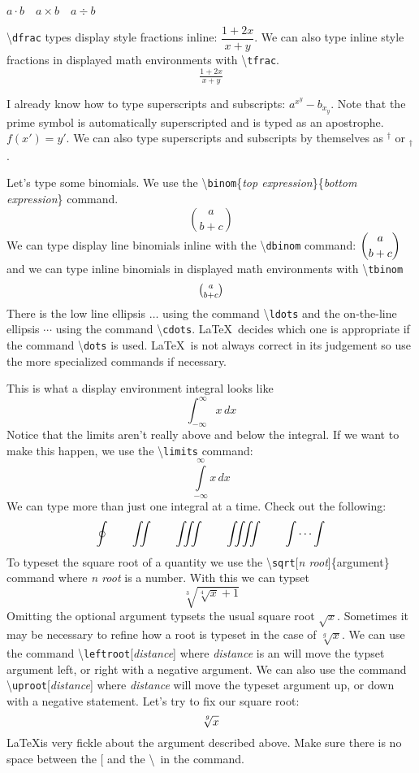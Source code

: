\documentclass[12pt]{amsart}
\begin{document}
\(a \cdot b \quad a \times b \quad a \div b \)

\textbackslash \texttt{dfrac} types display style fractions inline: \( \dfrac{1 + 2x}{x + y} \). We can also type inline style fractions in displayed math environments with \textbackslash \texttt{tfrac}.
\[
   \tfrac{1 + 2x}{x + y}
\]
\vspace{15pt}

I already know how to type superscripts and subscripts: \( a^{x^{y}} - b_{x_{y}} \). Note that the prime symbol is automatically superscripted and is typed as an apostrophe. \( f(x') = y' \). We can also type superscripts and subscripts by themselves as \( {}^{\dagger} \) or \( {}_{\dagger} \). 

Let's type some binomials. We use the \textbackslash \texttt{binom}\{\emph{top expression}\}\{\emph{bottom expression}\} command. 
\[
   \binom{a}{b + c}
\]
We can type display line binomials inline with the \textbackslash \texttt{dbinom} command: \( \dbinom{a}{b + c} \) and we can type inline binomials in displayed math environments with \textbackslash \texttt{tbinom}
\[
   \tbinom{a}{b + c}
\]
There is the low line ellipsis \( \ldots \) using the command \textbackslash \texttt{ldots} and the on-the-line ellipsis \( \cdots \) using the command \textbackslash \texttt{cdots}. \LaTeX \     decides which one is appropriate if the command \textbackslash \texttt{dots} is used. \LaTeX \ is not always correct in its judgement so use the more specialized commands if necessary. 
\vspace{15pt}

This is what a display environment integral looks like
\[
   \int_{-\infty}^{\infty} x \, dx
\]
Notice that the limits aren't really above and below the integral. If we want to make this happen, we use the \textbackslash \texttt{limits} command:
\[
   \int\limits_{-\infty}^{\infty} x \, dx
\]
We can type more than just one integral at a time. Check out the following:
\[
   \oint \qquad \iint \qquad \iiint \qquad \iiiint \qquad \idotsint
\]
To typeset the square root of a quantity we use the \textbackslash \texttt{sqrt}[\emph{n root}]\{argument\} command where \emph{n root} is a number. With this we can typset
\[
   \sqrt[3]{\sqrt[4]{x}+1}
\]
Omitting the optional argument typsets the usual square root \( \sqrt{x} \). Sometimes it may be necessary to refine how a root is typeset in the case of \( \sqrt[g]{x} \). We can use the command \textbackslash \texttt{leftroot}[\emph{distance}] where \emph{distance} is an will move the typset argument left, or right with a negative argument. We can also use the command \textbackslash \texttt{uproot}[\emph{distance}] where \emph{distance} will move the typeset argument up, or down with a negative statement. Let's try to fix our square root:
\[
   \sqrt[\uproot{4} g]{x}
\]
\LaTeX is very fickle about the argument described above. Make sure there is no space between the [ and the \textbackslash \  in the command.
\vspace{15pt}
\end{document}
